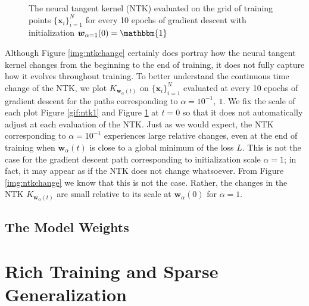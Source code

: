 \documentclass{article}
\begin{document}
\begin{figure}[H]
\caption{The neural tangent kernel (NTK) evaluated on the grid of training points $\{ \boldsymbol{x}_i \}_{i=1}^N$ for every 10 epochs of gradient descent with initialization $\boldsymbol{w}_{\alpha = 1}(0) = \mathbbm{1}$}\label{gif:ntk2}
\end{figure}

Although Figure \ref{img:ntkchange} certainly does portray how the neural tangent kernel changes from the beginning to the end of training, it does not fully capture how it evolves throughout training. To better understand the continuous time change of the NTK, we plot $K_{\boldsymbol{w}_{\alpha}(t)}$ on $\{ \boldsymbol{x}_i \}_{i=1}^N$ evaluated at every 10 epochs of gradient descent for the paths corresponding to $\alpha = 10^{-1}, \ 1$. We fix the scale of each plot Figure \ref{gif:ntk1} and Figure \ref{gif:ntk2} at $t = 0$ so that it does not automatically adjust at each evaluation of the NTK. Just as we would expect, the NTK corresponding to $\alpha = 10^{-1}$ experiences large relative changes, even at the end of training when $\boldsymbol{w}_{\alpha}(t)$ is close to a global minimum of the loss $L$. This is not the case for the gradient descent path corresponding to initialization scale $\alpha = 1$; in fact, it may appear as if the NTK does not change whatsoever. From Figure \ref{img:ntkchange} we know that this is not the case. Rather, the changes in the NTK $K_{\boldsymbol{w}_{\alpha}(t)}$ are small relative to its scale at $\boldsymbol{w}_{\alpha}(0)$ for $\alpha = 1$.

\subsection{The Model Weights}

\section{Rich Training and Sparse Generalization}

\pagebreak



\end{document}
